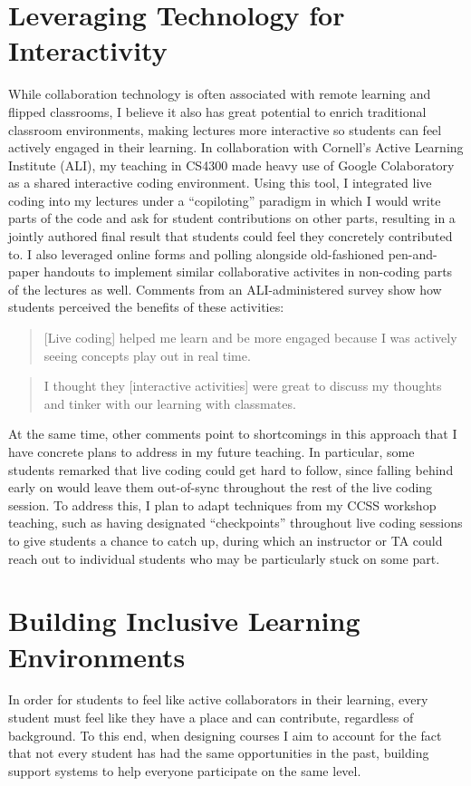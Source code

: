 \documentclass[12pt,letterpaper]{article}
\newcommand\interactionimprove\lainteractionend
\newcommand\interactionimprove\geninteractionend
\begin{document}
\section{Leveraging Technology for Interactivity}
While collaboration technology is often associated with remote learning and flipped classrooms, I believe it also has great potential to enrich traditional classroom environments, making lectures more interactive so students can feel actively engaged in their learning.
In collaboration with Cornell's Active Learning Institute (ALI), my teaching in CS4300 made heavy use of Google Colaboratory as a shared interactive coding environment.
Using this tool, I integrated live coding into my lectures under a ``copiloting'' paradigm in which I would write parts of the code and ask for student contributions on other parts, resulting in a jointly authored final result that students could feel they concretely contributed to.
I also leveraged online forms and polling alongside old-fashioned pen-and-paper handouts to implement similar collaborative activites in non-coding parts of the lectures as well.
Comments from an ALI-administered survey show how students perceived the benefits of these activities:

\begin{quote}
    [Live coding] helped me learn and be more engaged because I was actively seeing concepts play out in real time.
\end{quote}
\begin{quote}
    I thought they [interactive activities] were great to discuss my thoughts and tinker with our learning with classmates.
\end{quote}

At the same time, other comments point to shortcomings in this approach that I have concrete plans to address in my future teaching.
In particular, some students remarked that live coding could get hard to follow, since falling behind early on would leave them out-of-sync throughout the rest of the live coding session.
To address this, I plan to adapt techniques from my CCSS workshop teaching, such as having designated ``checkpoints'' throughout live coding sessions to give students a chance to catch up, during which an instructor
\ifliberalarts
%
\else
or TA
\fi
could reach out to individual students who may be particularly stuck on some part.
\interactionimprove

\section{Building Inclusive Learning Environments}
In order for students to feel like active collaborators in their learning, every student must feel like they have a place and can contribute, regardless of background.
To this end, when designing courses I aim to account for the fact that not every student has had the same opportunities in the past, building support systems to help everyone participate on the same level.
\end{document}
